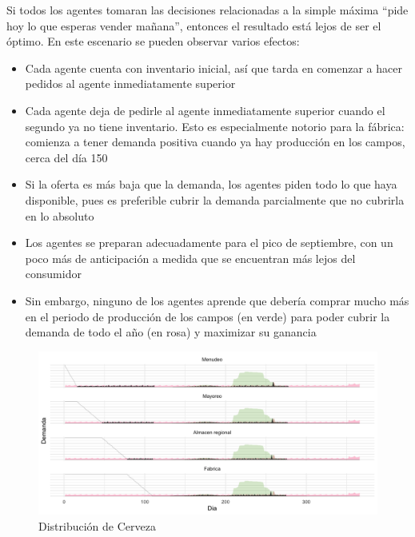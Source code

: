 Si todos los agentes tomaran las decisiones relacionadas a la simple m\'axima ``pide hoy lo que esperas vender ma\~nana'', entonces el resultado est\'a lejos de ser el \'optimo.
En este escenario se pueden observar varios efectos: 
\begin{itemize}
    \item Cada agente cuenta con inventario inicial, as\'i que tarda en comenzar a hacer pedidos al agente inmediatamente superior
    \item Cada agente deja de pedirle al agente inmediatamente superior cuando el segundo ya no tiene inventario. Esto es especialmente notorio para la f\'abrica: comienza a tener demanda positiva cuando ya hay producci\'on en los campos, cerca del d\'ia 150
    \item Si la oferta es m\'as baja que la demanda, los agentes piden todo lo que haya disponible, pues es preferible cubrir la demanda parcialmente que no cubrirla en lo absoluto
    \item Los agentes se preparan adecuadamente para el pico de septiembre, con un poco m\'as de anticipaci\'on a medida que se encuentran m\'as lejos del consumidor
    \item Sin embargo, ninguno de los agentes aprende que deber\'ia comprar mucho m\'as en el periodo de producci\'on de los campos (en verde) para poder cubrir la demanda de todo el a\~no (en rosa) y maximizar su ganancia
\end{itemize}

\begin{figure}[ht!]
\caption{Distribuci\'on de Cerveza}
\label{analytic_3}
\includegraphics[width=16cm]{tesis_tex/figs/analytic_with_fields_restriction.png}
\centering
\end{figure}

